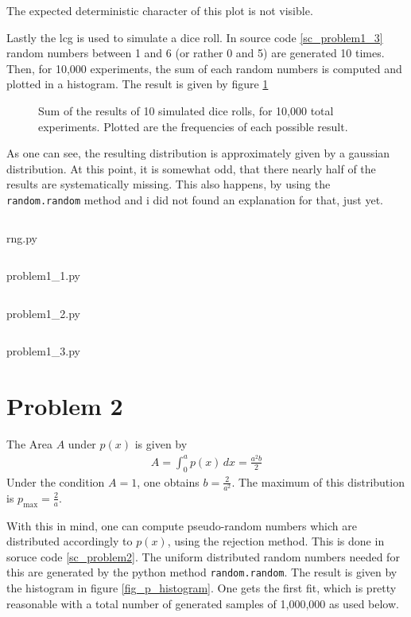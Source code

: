 \documentclass[12pt, a4paper]{article}
\begin{document}
  The expected deterministic character of this plot is not visible.

  Lastly the lcg is used to simulate a dice roll.
  In source code \ref{sc_problem1_3} random numbers between 1 and 6 (or rather 0 and 5) are generated 10 times.
  Then, for 10,000 experiments, the sum of each random numbers is computed and plotted in a histogram.
  The result is given by figure \ref{fig_dice_roll}

  \begin{figure}[h]
    \centering
    \resizebox{0.6\textwidth}{!}{
      
    }
    \caption{
      Sum of the results of 10 simulated dice rolls, for 10,000 total experiments.
      Plotted are the frequencies of each possible result.
    }
    \label{fig_dice_roll}
  \end{figure}

  As one can see, the resulting distribution is approximately given by a gaussian distribution.
  At this point, it is somewhat odd, that there nearly half of the results are systematically missing.
  This also happens, by using the \texttt{random.random} method and i did not found an explanation for that, just yet.

  \newpage
  \captionsetup{type=listing}
  \inputminted{python}{rng.py}
  \caption{rng.py}
  \label{sc_rng}

  \captionsetup{type=listing}
  \inputminted{python}{problem1_1.py}
  \caption{problem1\_1.py}
  \label{sc_problem1_1}

  \captionsetup{type=listing}
  \inputminted{python}{problem1_2.py}
  \caption{problem1\_2.py}
  \label{sc_problem1_2}

  \captionsetup{type=listing}
  \inputminted{python}{problem1_3.py}
  \caption{problem1\_3.py}
  \label{sc_problem1_3}

  \newpage
  \section*{Problem 2}
  The Area $A$ under $p(x)$ is given by
  \begin{align}
    A = \int_0^a p(x) \, dx = \frac{a^2 b}{2}
  \end{align}
  Under the condition $A = 1$, one obtains $b = \frac{2}{a^2}$.
  The maximum of this distribution is $p_\text{max} = \frac{2}{a}$.

  With this in mind, one can compute pseudo-random numbers which are distributed accordingly to $p(x)$, using the rejection method.
  This is done in soruce code \ref{sc_problem2}.
  The uniform distributed random numbers needed for this are generated by the python method \texttt{random.random}.
  The result is given by the histogram in figure \ref{fig_p_histogram}.
  One gets the first fit, which is pretty reasonable with a total number of generated samples of 1,000,000 as used below.
\end{document}
